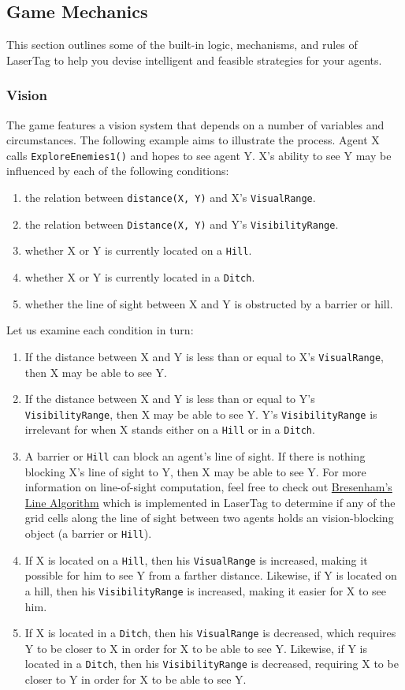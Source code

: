 \documentclass[
  a4paper,
  english,
  DIV=16,
  11pt,
  parskip=half,
  dvipsnames,
  listof=totoc,		     %
  index=totoc,		     %
  bibliography=totoc,	 %
]{scrartcl}
\begin{document}
\subsection{Game Mechanics} \label{ssec:gameMechs}
%
This section outlines some of the built-in logic, mechanisms, and rules of LaserTag to help you devise intelligent and feasible strategies for your agents.
%
\subsubsection{Vision} \label{sssec:vision}
The game features a vision system that depends on a number of variables and circumstances. The following example aims to illustrate the process. Agent X calls \texttt{ExploreEnemies1()} and hopes to see agent Y. X's ability to see Y may be influenced by each of the following conditions:
%
\begin{enumerate}
  \item the relation between \texttt{distance(X, Y)} and X's \texttt{VisualRange}.
  \item the relation between \texttt{Distance(X, Y)} and Y's \texttt{VisibilityRange}.
  \item whether X or Y is currently located on a \texttt{Hill}.
  \item whether X or Y is currently located in a \texttt{Ditch}.
  \item whether the line of sight between X and Y is obstructed by a barrier or hill.
\end{enumerate}
%
Let us examine each condition in turn:
%
\begin{enumerate}
  \item If the distance between X and Y is less than or equal to X's \texttt{VisualRange}, then X may be able to see Y.
  \item If the distance between X and Y is less than or equal to Y's \texttt{VisibilityRange}, then X may be able to see Y. Y's \texttt{VisibilityRange} is irrelevant for when X stands either on a \texttt{Hill} or in a \texttt{Ditch}.
  \item A barrier or \texttt{Hill} can block an agent's line of sight. If there is nothing blocking X's line of sight to Y, then X may be able to see Y. For more information on line-of-sight computation, feel free to check out \href{http://tech-algorithm.com/articles/drawing-line-using-bresenham-algorithm/}{Bresenham's Line Algorithm} which is implemented in LaserTag to determine if any of the grid cells along the line of sight between two agents holds an vision-blocking object (a barrier or \texttt{Hill}).
  \item If X is located on a \texttt{Hill}, then his \texttt{VisualRange} is increased, making it possible for him to see Y from a farther distance. Likewise, if Y is located on a hill, then his \texttt{VisibilityRange} is increased, making it easier for X to see him.
  \item If X is located in a \texttt{Ditch}, then his \texttt{VisualRange} is decreased, which requires Y to be closer to X in order for X to be able to see Y. Likewise, if Y is located in a \texttt{Ditch}, then his \texttt{VisibilityRange} is decreased, requiring X to be closer to Y in order for X to be able to see Y.
\end{enumerate}
\end{document}
